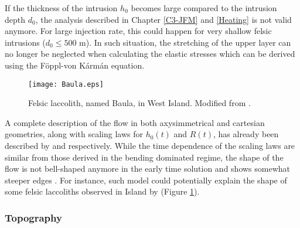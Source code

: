 If the thickness of the intrusion  $h_0$ becomes large compared to the
intrusion depth $d_0$, the  analysis described in Chapter \ref{C3-JFM}
and \ref{Heating} is not valid anymore. For large injection rate, this
could happen for very shallow  felsic intrusions ($d_0\le 500$ m).  In
such situation,  the stretching of  the upper  layer can no  longer be
neglected when calculating  the elastic stresses which  can be derived
using the Föppl-von Kármán equation. 

\begin{figure}[h!]
  \begin{center}
    \graphicspath{ {/Users/thorey/Documents/These/Manuscript/Figure/Chapter7/} }
    \texttt{[image: Baula.eps]}
    \caption{Felsic laccolith, named Baula, in West Island. Modified
      from \citet{Anonymous:jHnLP36x}.}
    \label{C7-Baula}
  \end{center}
\end{figure}

A  complete  description  of  the  flow  in  both  axysimmetrical  and
cartesian geometries, along with scaling laws for $h_0(t)$ and $R(t)$,
has    already   been    described   by    \citet{Lister:2013ia}   and
\citet{Anonymous:QWXp_4JV} respectively.  While the time dependence of
the  scaling  laws are  similar  from  those  derived in  the  bending
dominated regime, the shape of the  flow is not bell-shaped anymore in
the   early   time  solution   and   shows   somewhat  steeper   edges
\citep{Anonymous:QWXp_4JV}.    For   instance,    such   model   could
potentially explain  the shape of  some felsic laccoliths  observed in
Island by \citet{Anonymous:jHnLP36x} (Figure \ref{C7-Baula}).

\subsubsection*{Topography}
\label{sec:topography-1}

